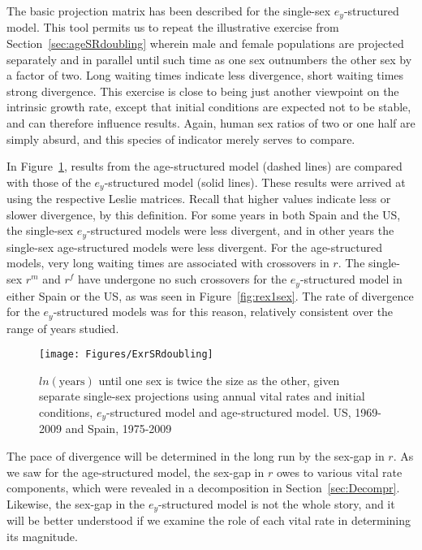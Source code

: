  \FloatBarrier
 \label{sex:doublingex}
The basic projection matrix has been described for the single-sex
$e_y$-structured model. This tool permits us to repeat the illustrative
exercise from Section~\ref{sec:ageSRdoubling} wherein male and female populations are
projected separately and in parallel until such time as one sex outnumbers the
other sex by a factor of two. Long waiting times indicate less divergence, short
waiting times strong divergence. This exercise is close to being just another
viewpoint on the intrinsic growth rate, except that initial conditions are
expected not to be stable, and can therefore influence results. Again,
human sex ratios of two or one half are simply absurd, and this species of
indicator merely serves to compare.

In Figure~\ref{fig:exSRdoubling}, results from the age-structured model (dashed
lines) are compared with those of the $e_y$-structured model (solid lines).
These results were arrived at using the respective Leslie matrices. Recall that
higher values indicate less or slower divergence, by this definition. For some 
years in both Spain and the US, the single-sex $e_y$-structured models were less 
divergent, and in other years the single-sex age-structured models were less divergent.
 For the age-structured models, very long waiting times are associated
with crossovers in $r$. The single-sex $r^m$ and $r^f$ have undergone no such
crossovers for the $e_y$-structured model in either Spain or the US, as was seen in
Figure~\ref{fig:rex1sex}. The rate of divergence for the $e_y$-structured models
was for this reason, relatively consistent over the range of years studied. 

\begin{figure}[ht!]
        \centering  
          \caption{$ln(\mathrm{years})$ until one sex is twice the size as the
          other, given separate single-sex projections using annual vital rates and initial
          conditions, $e_y$-structured model and age-structured model. US,
          1969-2009 and Spain, 1975-2009}
           \texttt{[image: Figures/ExrSRdoubling]}
          \label{fig:exSRdoubling}
\end{figure}

The pace of divergence will be determined in the long run by the sex-gap in $r$.
As we saw for the age-structured model, the sex-gap in $r$ owes to various vital
rate components, which were revealed in a decomposition in
Section~\ref{sec:Decompr}. Likewise, the sex-gap in the $e_y$-structured model
is not the whole story, and it will be better understood if we examine the role
of each vital rate in determining its magnitude.

 \FloatBarrier